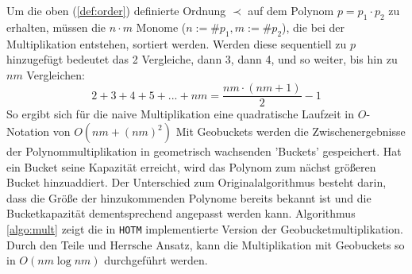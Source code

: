 Um die oben (\ref{def:order}) definierte Ordnung $\prec$ auf dem Polynom $p = p_1 \cdot p_2$ zu erhalten, müssen die $n\cdot m$ Monome ($n := \#p_1, m := \#p_2$), die bei der Multiplikation entstehen, sortiert werden. Werden diese sequentiell zu $p$ hinzugefügt bedeutet das 2 Vergleiche, dann 3, dann 4, und so weiter, bis hin zu $nm$ Vergleichen:
$$ 2 + 3 + 4 + 5 + ... + nm = \frac{nm \cdot (nm + 1)}{2} - 1$$
So ergibt sich für die naive Multiplikation eine quadratische Laufzeit in $O$-Notation von $O(nm + (nm)^2)$
Mit Geobuckets werden die Zwischenergebnisse der Polynommultiplikation in geometrisch wachsenden 'Buckets' gespeichert. Hat ein Bucket seine Kapazität erreicht, wird das Polynom zum nächst größeren Bucket hinzuaddiert. Der Unterschied zum Originalalgorithmus besteht darin, dass die Größe der hinzukommenden Polynome bereits bekannt ist und die Bucketkapazität dementsprechend angepasst werden kann. Algorithmus \ref{algo:mult} zeigt die in \verb+HOTM+ implementierte Version der Geobucketmultiplikation. Durch den Teile und Herrsche Ansatz, kann die Multiplikation mit Geobuckets so in $O(nm \log nm)$ durchgeführt werden.





















